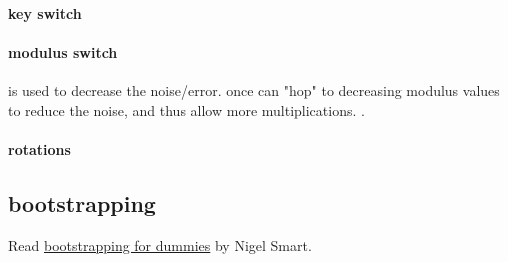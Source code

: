 \paragraph{key switch}
\paragraph{modulus switch}
is used to decrease the noise/error. once can "hop" to decreasing modulus values to reduce the noise, and thus allow 
more multiplications. .

\paragraph{rotations}
\subsection{bootstrapping}
Read \href{https://www.zama.ai/post/what-is-bootstrapping-homomorphic-encryption}{bootstrapping for dummies} by Nigel Smart.






